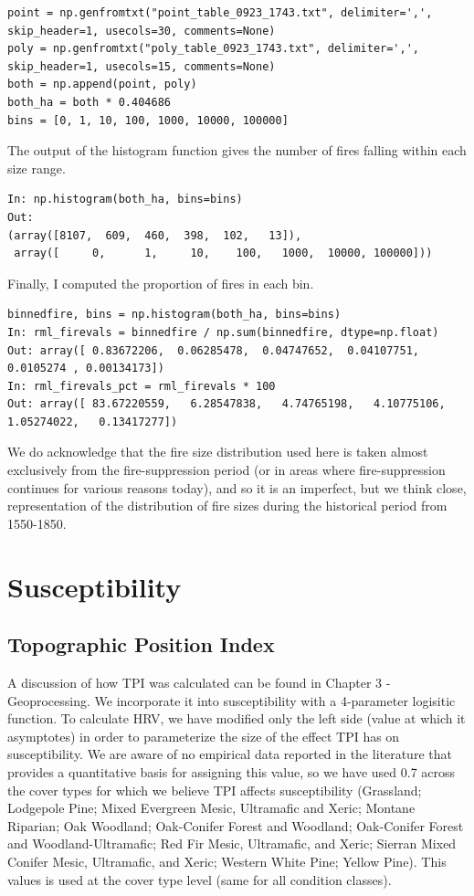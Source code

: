 \begin{lstlisting}
point = np.genfromtxt("point_table_0923_1743.txt", delimiter=',', skip_header=1, usecols=30, comments=None)
poly = np.genfromtxt("poly_table_0923_1743.txt", delimiter=',', skip_header=1, usecols=15, comments=None)
both = np.append(point, poly)
both_ha = both * 0.404686
bins = [0, 1, 10, 100, 1000, 10000, 100000]
\end{lstlisting}

The output of the histogram function gives the number of fires falling within each size range.
\begin{lstlisting}
In: np.histogram(both_ha, bins=bins)
Out: 
(array([8107,  609,  460,  398,  102,   13]),
 array([     0,      1,     10,    100,   1000,  10000, 100000]))
\end{lstlisting}

Finally, I computed the proportion of fires in each bin.
\begin{lstlisting}
binnedfire, bins = np.histogram(both_ha, bins=bins)
In: rml_firevals = binnedfire / np.sum(binnedfire, dtype=np.float)
Out: array([ 0.83672206,  0.06285478,  0.04747652,  0.04107751,  0.0105274 , 0.00134173])
In: rml_firevals_pct = rml_firevals * 100
Out: array([ 83.67220559,   6.28547838,   4.74765198,   4.10775106, 1.05274022,   0.13417277])
\end{lstlisting}

We do acknowledge that the fire size distribution used here is taken almost exclusively from the fire-suppression period (or in areas where fire-suppression continues for various reasons today), and so it is an imperfect, but we think close, representation of the distribution of fire sizes during the historical period from 1550-1850.        

\section{Susceptibility}
\subsection{Topographic Position Index} A discussion of how TPI was calculated can be found in Chapter 3 - Geoprocessing. We incorporate it into susceptibility with a 4-parameter logisitic function. To calculate HRV, we have modified only the left side (value at which it asymptotes) in order to parameterize the size of the effect TPI has on susceptibility. We are aware of no empirical data reported in the literature that provides a quantitative basis for assigning this value, so we have used 0.7 across the cover types for which we believe TPI affects susceptibility (Grassland; Lodgepole Pine; Mixed Evergreen Mesic, Ultramafic and Xeric; Montane Riparian; Oak Woodland; Oak-Conifer Forest and Woodland; Oak-Conifer Forest and Woodland-Ultramafic; Red Fir Mesic, Ultramafic, and Xeric; Sierran Mixed Conifer Mesic, Ultramafic, and Xeric; Western White Pine; Yellow Pine). This values is used at the cover type level (same for all condition classes).

